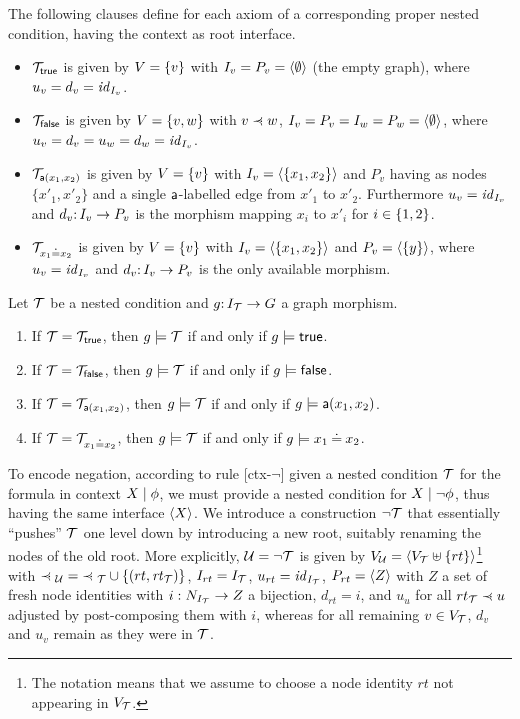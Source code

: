 \begin{definition}
\label{def:atomic formulas}
The following clauses define for each axiom of  a corresponding proper nested condition, having the context as root interface. 
\begin{itemize}
\item ${\mathcal{T}}_{\mathsf{true}}$ is given by $V=\{{v}\}$ with $I_v=P_v=\langle \emptyset\rangle$ (the empty graph), where $u_v=d_v={\mathit{id}}_{I_v}$.
\item ${\mathcal{T}}_{\mathsf{false}}$ is given by $V=\{{v,w}\}$ with $v\parentof w$, $I_v=P_v=I_w=P_w=\langle \emptyset\rangle$, where $u_v=d_v=u_w=d_w={\mathit{id}}_{I_v}$.
\item ${\mathcal{T}}_{\mathsf{a}(x_1,x_2)}$ is given by $V=\{{v}\}$ with $I_v=\langle \{{x_1,x_2}\}\rangle$ and $P_v$ having as nodes $\{x'_1, x'_2\}$ and a single $\mathsf{a}$-labelled edge from $x'_1$ to $x'_2$. Furthermore $u_v={\mathit{id}}_{I_v}$ and $d_v{:}\, I_v\rightarrow P_v$ is the morphism mapping $x_i$ to $x'_i$ for $i \in \{{1,2}\}$. 
\item ${\mathcal{T}}_{x_1\mathbin{\doteq} x_2}$ is given by $V=\{{v}\}$ with $I_v=\langle \{{x_1,x_2}\}\rangle$ and $P_v=\langle \{{y}\}\rangle$, where $u_v={\mathit{id}}_{I_v}$ and $d_v{:}\, I_v\rightarrow P_v$ is the only available morphism.
\end{itemize}
\end{definition}

\begin{proposition}
	\label{pr:atomic satisfaction}
Let ${\mathcal{T}}$ be a {\proper} nested condition and $g{:}\, I_{\mathcal{T}}\rightarrow G$ a graph morphism.
\begin{enumerate}
\item If ${\mathcal{T}}={\mathcal{T}}_{\mathsf{true}}$, then $g\models {\mathcal{T}}$ if and only if $g\models\mathsf{true}$.
\item If ${\mathcal{T}}={\mathcal{T}}_{\mathsf{false}}$, then $g\models {\mathcal{T}}$ if and only if $g\models\mathsf{false}$.
\item If ${\mathcal{T}}={\mathcal{T}}_{\mathsf{a}(x_1,x_2)}$, then $g\models {\mathcal{T}}$ if and only if $g\models\mathsf{a}(x_1,x_2)$.
\item If ${\mathcal{T}}={\mathcal{T}}_{x_1\mathbin{\doteq} x_2}$, then $g\models {\mathcal{T}}$ if and only if $g\models x_1\mathbin{\doteq} x_2$.
\end{enumerate}
\end{proposition}

To encode negation, according to rule [ctx-$\neg$] given a {\proper} nested condition ${\mathcal{T}}$ for the formula in context ${X} \mid {\phi}$, we must provide a {\proper} nested condition for ${X} \mid {\neg \phi}$, thus having the same interface $\langle X\rangle$. We introduce a construction $\neg{\mathcal{T}}$ that essentially ``pushes'' ${\mathcal{T}}$ one level down by introducing a new root, suitably renaming the nodes of the old root.
More explicitly, ${\mathcal{U}}=\neg{\mathcal{T}}$ is given by $V_{\mathcal{U}}=\langle V_{\mathcal{T}}\uplus\{{rt}\}\rangle$\footnote{The notation means that we assume to choose a node identity $rt$ not appearing in $V_{\mathcal{T}}$.} with ${\parentof_\cU}= {\parentof_\cT}\cup \setof{(rt,\rtof\cT)}$, $I_{rt} = I_{\mathcal{T}}$, $u_{rt}={\mathit{id}}_{I_{\mathcal{T}}}$, $P_{rt} = \langle Z\rangle$ with $Z$ a set of fresh node identities with $i: N_{I_{\mathcal{T}}} \rightarrow Z$ a bijection, $d_{rt} = i$,  and $u_u$ for all $rt_\cT \parentof u$ adjusted by post-composing them with $i$, whereas for all remaining $v\in V_{\mathcal{T}}$, $d_v$ and $u_v$ remain as they were in ${\mathcal{T}}$.

